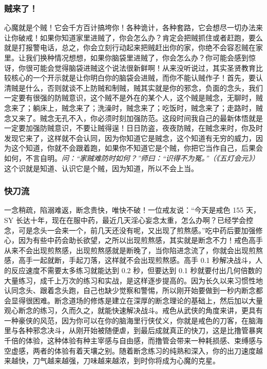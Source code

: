 \subsubsection{贼来了！}

心魔就是个贼！它会千方百计搞垮你！各种诡计，各种套路，它会想尽一切办法来让你破戒！如果你知道家里进贼了，你会怎么办？肯定会把贼抓住或者赶跑，要么就是打报警电话，总之，你会立刻行动起来把贼赶出你的家，你绝不会容忍贼在家里。让我们换种情况想想，如果你脑袋里进贼了，你会怎么办？你可能会感到惊讶，你很可能会觉得脑袋进贼这个说法很新鲜啊！从来没听说过，其实圣贤教育比较核心的一个开示就是让你明白你的脑袋会进贼，而你不能认贼作子！首先，要认清贼是什么，否则就谈不上防贼和制贼，贼其实就是你的邪念，负面的念头，我们一定要有很强的防贼意识，这个贼不是外在的某个人，这个贼是贼念，无聊时，贼念来了；躺床上，贼念来了；洗澡时，贼念来了；吃饭时，贼念来了；走路时，贼念又来了。贼念无孔不入，你必须时刻加强防范。这段时间我自己的最新体悟就是一定要加强防贼意识，不要让贼得逞！日日防盗，夜夜防贼，在贼念来时，你及时发现它来了，这样就不会认同，因为你知道它是贼念，这个知道有无穷的威力，因为这个知道，你就不会跟着跑，如果你不知道它是个贼，你把它当作自己，后果会如何，不言自明。\textit{问：“家贼难防时如何？”师曰：“识得不为冤。”（《五灯会元》）} 这个识就是知道、认识它是个贼，因为知道，所以不会上当。

\subsubsection{快刀流}

一念稍疏，陷溺难返，断念贵快，唯快不破！一位戒友说：“今天是戒色 155 天，SY 长达十年，现在在服中药，最近几天淫心妄念太重，怎么办啊？已经学会控念，可是念头一会来一个，前几天还没有呢，又出现了煎熬感。”吃中药后要加强修心，因为有些中药会助长欲望，之所以出现煎熬感，其实就是断念不力！戒色高手从来不会出现煎熬感，出现煎熬感就是断晚了，当你陷进念流了，你就会出现煎熬感，高手一起就断，手起刀落，这样就不会出现煎熬感。高手 0.1 秒解决战斗，人的反应速度不需要太多练习就能达到 0.2 秒，但要达到 0.1 秒就要付出几何倍数的大量练习，成千上万次的练习和实战，是这样逐步提高的。因为长久以来习惯性地认同念头、跟着念头跑，自己也缺少觉察和警惕，所以刚开始要做到一秒内断念都会显得很困难。断念道场的修炼是建立在深厚的断念理论的基础上，然后加以大量观心断念的练习，久而久之，就能快速解决战斗。戒色从武侠的角度来讲，更具有一种豪侠的风范，因为你可以在你的脑海里行侠仗义，你就是戒色的刀客，在脑海里与各种邪念决斗，从刚开始被随便虐，到最后成就真正的快刀，这是比撸管暴爽千倍的体验，这种体验有种主宰感与自由感，而撸管会带来一种耗损感、束缚感与空虚感，两者的体验有着天壤之别。随着断念练习的纯熟和深入，你的出刀速度越来越快，刀气越来越强，刀味越来越浓，到时你将成为心魔的克星。

